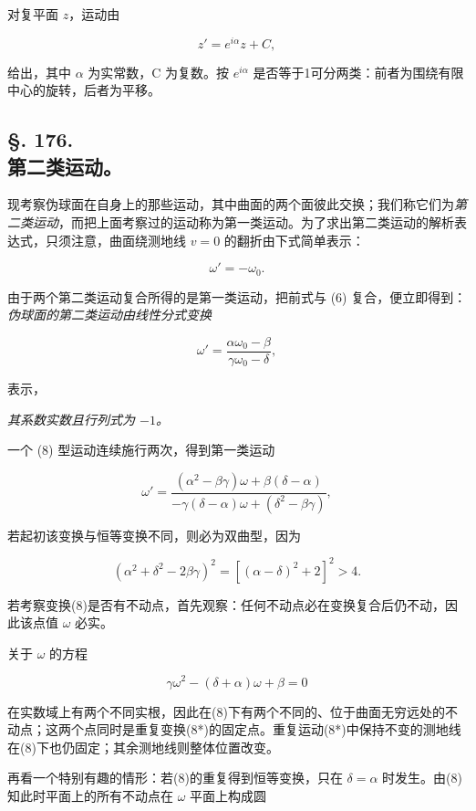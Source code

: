对复平面 $z$，运动由

\[
 z'=e^{i\alpha}z+C,
\]

给出，其中 $\alpha$ 为实常数，C 为复数。按 $e^{i\alpha}$ 是否等于1可分两类：前者为围绕有限中心的旋转，后者为平移。



\subsection*{§. 176.\\ 第二类运动。}



现考察伪球面在自身上的那些运动，其中曲面的两个面彼此交换；我们称它们为\emph{第二类运动}，而把上面考察过的运动称为第一类运动。为了求出第二类运动的解析表达式，只须注意，曲面绕测地线 \(v=0\) 的翻折由下式简单表示：

\[
 \omega'=-\omega_0.
\]

由于两个第二类运动复合所得的是第一类运动，把前式与 (6) 复合，便立即得到：\emph{伪球面的第二类运动由线性分式变换}

\[
\tag{8}
 \omega'=\frac{\alpha\omega_0-\beta}{\gamma\omega_0-\delta},
\]

表示，

\emph{其系数实数且行列式为 $-1$。}



一个 (8) 型运动连续施行两次，得到第一类运动

\[
\tag{8*}
 \omega'=\frac{(\alpha^2-\beta\gamma)\omega+\beta(\delta-\alpha)}
 {-\gamma(\delta-\alpha)\omega+(\delta^2-\beta\gamma)},
\]

若起初该变换与恒等变换不同，则必为双曲型，因为

\[
 (\alpha^2+\delta^2-2\beta\gamma)^2=
 \left[(\alpha-\delta)^2+2\right]^2>4.
\]

若考察变换(8)是否有不动点，首先观察：任何不动点必在变换复合后仍不动，因此该点值 $\omega$ 必实。



关于 \(\omega\) 的方程

\[
 \gamma\omega^2-(\delta+\alpha)\omega+\beta=0
\]

在实数域上有两个不同实根，因此在(8)下有两个不同的、位于曲面无穷远处的不动点；这两个点同时是重复变换(8*)的固定点。重复运动(8*)中保持不变的测地线在(8)下也仍固定；其余测地线则整体位置改变。



再看一个特别有趣的情形：若(8)的重复得到恒等变换，只在 $\delta=\alpha$ 时发生。由(8)知此时平面上的所有不动点在 $\omega$ 平面上构成圆

